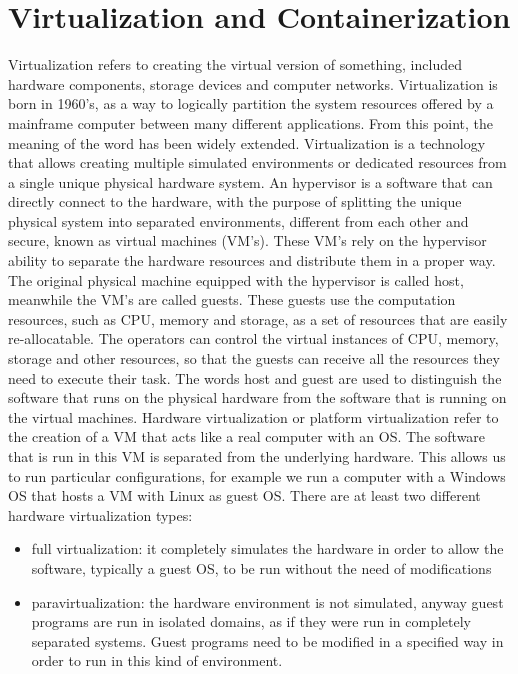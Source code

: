 \section{Virtualization and Containerization}
Virtualization refers to creating the virtual version of something, included
hardware components, storage devices and computer networks.
Virtualization is born in 1960's, as a way to logically partition the system
resources offered by a mainframe computer between many different
applications. From this point, the meaning of the word has been
widely extended.
Virtualization is a technology that allows creating multiple simulated
environments or dedicated resources from a single unique physical
hardware system. An hypervisor is a software that can directly
connect to the hardware, with the purpose of splitting the unique
physical system into separated environments, different from each other 
and secure, known as virtual machines (VM's). These VM's rely on
the hypervisor ability to separate the hardware resources and distribute
them in a proper way.
The original physical machine equipped with the hypervisor is
called host, meanwhile the VM's are called guests. These guests use the computation resources, such as CPU, memory and storage, as a set of resources that are easily re-allocatable. The operators can control the virtual instances of CPU, memory, storage
and other resources, so that the guests can receive all the resources they need
to execute their task. The words host and guest are used to distinguish the software that runs on the physical hardware from the software that is running on the virtual machines.
Hardware virtualization or platform virtualization refer to the creation
of a VM that acts like a real computer with an OS. The software
that is run in this VM is separated from the underlying hardware.
This allows us to run particular configurations, for example we run a
computer with a Windows OS that hosts a VM with Linux as guest OS.
There are at least two different hardware virtualization types:
\begin{itemize}
	\item full virtualization: it completely simulates the hardware in order
	to allow the software, typically a guest OS, to be run without the
	need of modifications
	\item paravirtualization: the hardware environment is not simulated,
	anyway guest programs are run in isolated domains, as if they
	were run in completely separated systems. Guest programs need
	to be modified in a specified way in order to run in this kind
	of environment.
\end{itemize}
